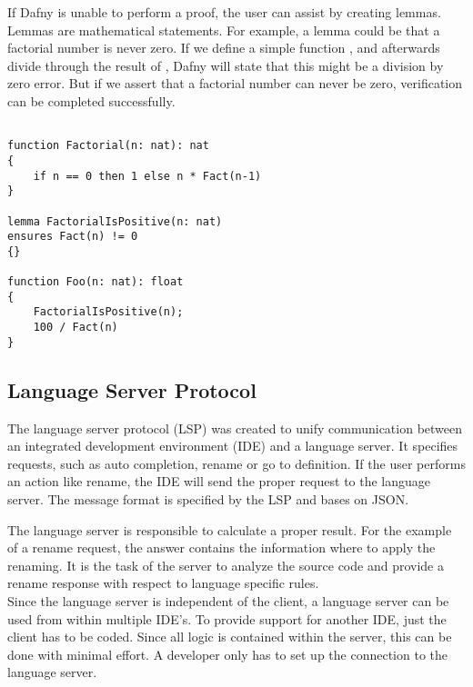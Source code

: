 If Dafny is unable to perform a proof, the user can assist by creating lemmas.
Lemmas are mathematical statements.
For example, a lemma could be that a factorial number is never zero.
If we define a simple function , and afterwards divide through the result of , Dafny will state that this might be a division by zero error.
But if we assert that a factorial number can never be zero, verification can be completed successfully.
\begin{lstlisting}[language=dafny, caption={Lemmas}, captionpos=b, label={lst:lemma}]

function Factorial(n: nat): nat
{
    if n == 0 then 1 else n * Fact(n-1)
}

lemma FactorialIsPositive(n: nat)
ensures Fact(n) != 0
{}

function Foo(n: nat): float
{
    FactorialIsPositive(n);
    100 / Fact(n)
}
\end{lstlisting}


\subsection{Language Server Protocol}
The language server protocol (LSP) was created to unify communication between an integrated development environment (IDE) and a language server.
It specifies requests, such as auto completion, rename or go to definition.
If the user performs an action like rename, the IDE will send the proper request to the language server.
The message format is specified by the LSP and bases on JSON.

The language server is responsible to calculate a proper result.
For the example of a rename request, the answer contains the information where to apply the renaming.
It is the task of the server to analyze the source code and provide a rename response with respect to language specific rules.\\

Since the language server is independent of the client, a language server can be used from within multiple IDE's.
To provide support for another IDE, just the client has to be coded.
Since all logic is contained within the server, this can be done with minimal effort.
A developer only has to set up the connection to the language server.



